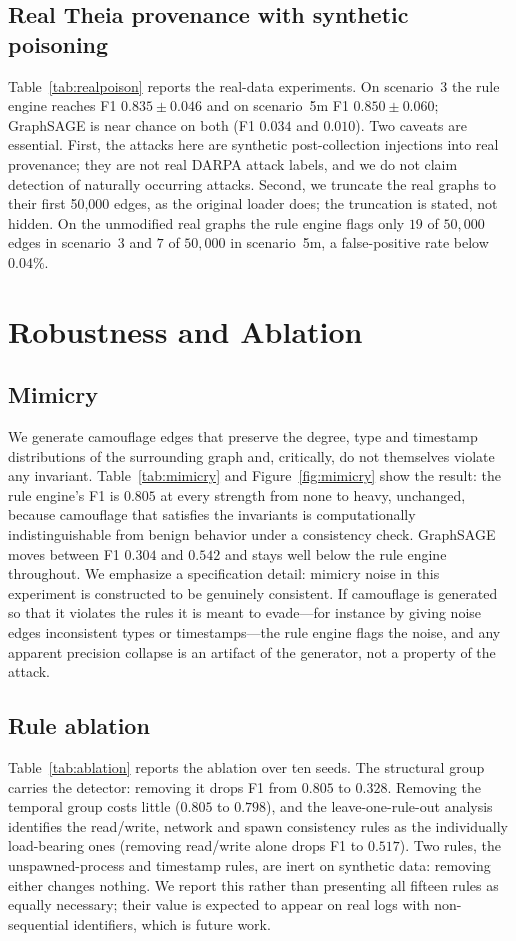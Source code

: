 \documentclass[conference]{IEEEtran}
\begin{document}
\subsection{Real Theia provenance with synthetic poisoning}
Table~\ref{tab:realpoison} reports the real-data experiments. On scenario~3 the
rule engine reaches F1 $0.835\pm0.046$ and on scenario~5m F1 $0.850\pm0.060$;
GraphSAGE is near chance on both (F1 $0.034$ and $0.010$). Two caveats are
essential. First, the attacks here are synthetic post-collection injections into
real provenance; they are not real DARPA attack labels, and we do not claim
detection of naturally occurring attacks. Second, we truncate the real graphs to
their first 50{,}000 edges, as the original loader does; the truncation is
stated, not hidden. On the unmodified real graphs the rule engine flags only
$19$ of $50{,}000$ edges in scenario~3 and $7$ of $50{,}000$ in scenario~5m, a
false-positive rate below $0.04\%$.

\section{Robustness and Ablation}
\label{sec:robust}
\subsection{Mimicry}
We generate camouflage edges that preserve the degree, type and timestamp
distributions of the surrounding graph and, critically, do not themselves
violate any invariant. Table~\ref{tab:mimicry} and Figure~\ref{fig:mimicry}
show the result: the rule engine's F1 is $0.805$ at every strength from none to
heavy, unchanged, because camouflage that satisfies the invariants is
computationally indistinguishable from benign behavior under a consistency
check. GraphSAGE moves between F1 $0.304$ and $0.542$ and stays well below the
rule engine throughout. We emphasize a specification detail: mimicry noise in
this experiment is constructed to be genuinely consistent. If camouflage is
generated so that it violates the rules it is meant to evade---for instance by
giving noise edges inconsistent types or timestamps---the rule engine flags the
noise, and any apparent precision collapse is an artifact of the generator, not
a property of the attack.

\subsection{Rule ablation}
Table~\ref{tab:ablation} reports the ablation over ten seeds. The structural
group carries the detector: removing it drops F1 from $0.805$ to $0.328$.
Removing the temporal group costs little ($0.805$ to $0.798$), and the
leave-one-rule-out analysis identifies the read/write, network and spawn
consistency rules as the individually load-bearing ones (removing read/write
alone drops F1 to $0.517$). Two rules, the unspawned-process and timestamp
rules, are inert on synthetic data: removing either changes nothing. We report
this rather than presenting all fifteen rules as equally necessary; their value
is expected to appear on real logs with non-sequential identifiers, which is
future work.
\end{document}
